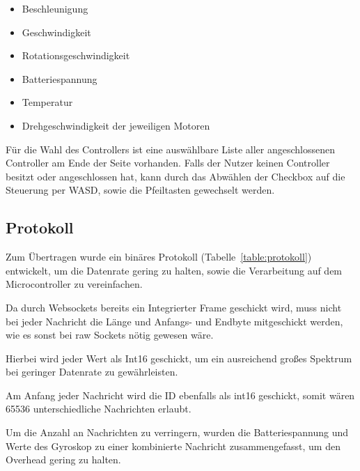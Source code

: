 \begin{itemize}
	\item Beschleunigung 
	\item Geschwindigkeit
	\item Rotationsgeschwindigkeit
	\item Batteriespannung
	\item Temperatur
	\item Drehgeschwindigkeit der jeweiligen Motoren
\end{itemize}\par


\vspace{\baselineskip}
Für die Wahl des Controllers ist eine auswählbare Liste aller angeschlossenen Controller am Ende der Seite vorhanden. Falls der Nutzer keinen Controller besitzt oder angeschlossen hat, kann durch das Abwählen der Checkbox auf die Steuerung per WASD, sowie die Pfeiltasten gewechselt werden.\par

\subsection{Protokoll}
Zum Übertragen wurde ein binäres Protokoll (Tabelle~\ref{table:protokoll}) entwickelt, um die Datenrate gering zu halten, sowie die Verarbeitung auf dem Microcontroller zu vereinfachen.\par

Da durch Websockets bereits ein Integrierter Frame geschickt wird, muss nicht bei jeder Nachricht die Länge und Anfangs- und Endbyte mitgeschickt werden, wie es sonst bei raw Sockets nötig gewesen wäre.\par

Hierbei wird jeder Wert als Int16 geschickt, um ein ausreichend großes Spektrum bei geringer Datenrate zu gewährleisten. \par

Am Anfang jeder Nachricht wird die ID ebenfalls als int16 geschickt, somit wären 65536 unterschiedliche Nachrichten erlaubt.\par

Um die Anzahl an Nachrichten zu verringern, wurden die Batteriespannung und Werte des Gyroskop zu einer kombinierte Nachricht zusammengefasst, um den Overhead gering zu halten.\par

